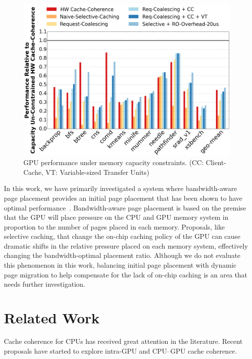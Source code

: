 \begin{figure}[t]
\includegraphics[width=1.0\columnwidth]{hpca2016/figures/capacityconstrained.png}
\caption{GPU performance under memory capacity constraints. (CC: Client-Cache,
VT: Variable-sized Transfer Units)}
\label{fig:capacityconstrained}
\end{figure}

In this work, we have primarily investigated a system where bandwidth-aware page placement
provides an initial page placement that has been shown to have optimal performance~\cite{Agarwal2015}.
Bandwidth-aware page placement is based on the premise that the GPU will place pressure on
the CPU and GPU memory system in proportion to the number of pages placed in each memory.  Proposals,
like selective caching, that change the on-chip caching policy of the GPU can cause dramatic
shifts in the relative pressure placed on each memory system, effectively changing the bandwidth-optimal 
placement ratio.  Although we do not evaluate this phenomenon in this work, balancing
initial page placement with dynamic page migration to help compensate for the lack of on-chip
caching is an area that needs further investigation.

\section{Related Work}
\label{related_work}

Cache coherence for CPUs has received great attention in the literature.
Recent proposals have started to explore intra-GPU and CPU--GPU cache coherence.

